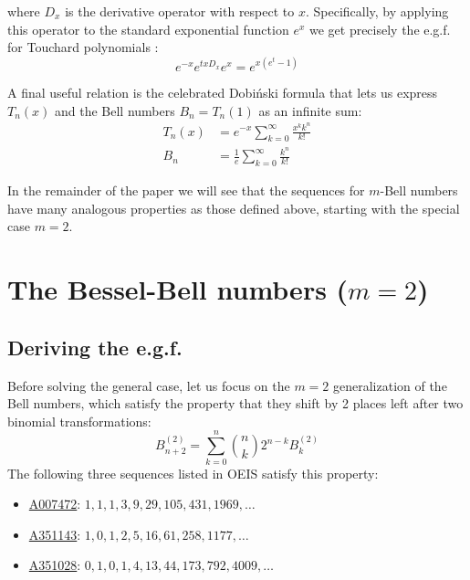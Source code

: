 \documentclass[a4paper]{amsart}
\begin{document}
where $D_x$ is the derivative operator with respect to $x$. Specifically, by applying this operator to the standard exponential function $e^x$ we get precisely the e.g.f. for Touchard polynomials \cite{dattoliTouchardPolynomialsGeneralized2010}:
\[
e^{-x}e^{txD_x}e^x = e^{x(e^t-1)}
\]

A final useful relation is the celebrated Dobiński formula\cite{wilfGeneratingfunctionologyThirdEdition2005} that lets us express $T_n(x)$ and the Bell numbers $B_n = T_n(1)$ as an infinite sum:
\begin{equation}\label{eq-bell-dobinski}
\begin{aligned}
T_n(x) & =e^{-x}\sum_{k=0}^{\infty}\frac{x^k k^n}{k!} \\
B_n & = \frac{1}{e}\sum_{k=0}^{\infty}\frac{k^n}{k!}
\end{aligned}
\end{equation}

In the remainder of the paper we will see that the sequences for $m$-Bell numbers have many analogous properties as those defined above, starting with the special case $m = 2$.

\section{The Bessel-Bell numbers ($m=2$)}\label{sec-m2}
\subsection{Deriving the e.g.f.}
\noindent Before solving the general case, let us focus on the $m=2$ generalization of the Bell numbers, which satisfy the property that they shift by 2 places left after two binomial transformations:
\begin{equation}\label{eq-2bell-recurrence}
B^{(2)}_{n+2} = \sum_{k=0}^n \binom{n}{k} 2^{n-k} B_k^{(2)}
\end{equation}
The following three sequences listed in OEIS satisfy this property:
\begin{itemize}
    \item \href{https://oeis.org/A007472}{A007472}: $1, 1, 1, 3, 9, 29, 105, 431, 1969, \ldots$
    \item \href{https://oeis.org/A351143}{A351143}: $1, 0, 1, 2, 5, 16, 61, 258, 1177, \ldots$
    \item \href{https://oeis.org/A351028}{A351028}: $0, 1, 0, 1, 4, 13, 44, 173, 792, 4009, \ldots$
\end{itemize}
\end{document}
